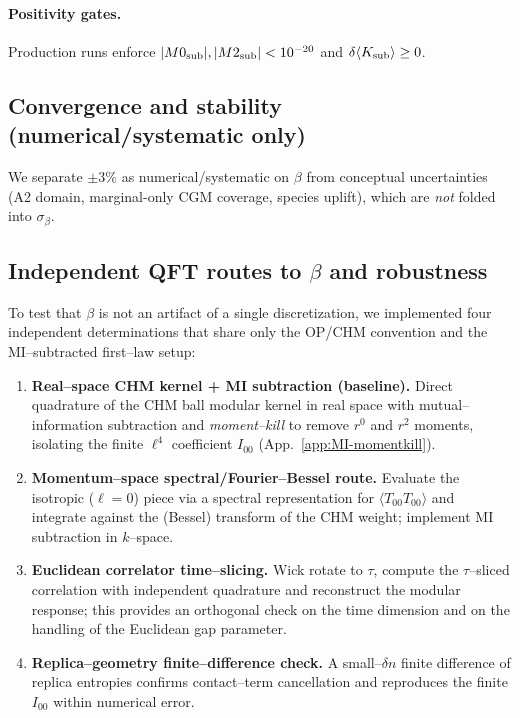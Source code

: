 \documentclass[aps,prd,onecolumn,superscriptaddress,nofootinbib]{revtex4-2}
\begin{document}
\paragraph*{Positivity gates.}
Production runs enforce $|M0_{\rm sub}|,|M2_{\rm sub}|<10^{-20}$ and $\delta\langle K_{\rm sub}\rangle \ge 0$.

\subsection{Convergence and stability (numerical/systematic only)}
\label{sec:convergence}
We separate $\pm3\%$ as numerical/systematic on $\beta$ from conceptual uncertainties (A2 domain, marginal-only CGM coverage, species uplift), which are \emph{not} folded into $\sigma_\beta$.

\subsection{Independent QFT routes to \texorpdfstring{$\beta$}{beta} and robustness}
\label{sec:beta-multimethod}
To test that $\beta$ is not an artifact of a single discretization, we implemented four independent determinations that share only the OP/CHM convention and the MI–subtracted first–law setup:

\begin{enumerate}[leftmargin=1.3em,label=(\alph*)]
\item \textbf{Real–space CHM kernel + MI subtraction (baseline).} Direct quadrature of the CHM ball modular kernel in real space with mutual–information subtraction and \emph{moment–kill} to remove $r^0$ and $r^2$ moments, isolating the finite $\ell^4$ coefficient $I_{00}$ (App.~\ref{app:MI-momentkill}).

\item \textbf{Momentum–space spectral/Fourier–Bessel route.} Evaluate the isotropic ($\ell=0$) piece via a spectral representation for $\langle T_{00} T_{00} \rangle$ and integrate against the (Bessel) transform of the CHM weight; implement MI subtraction in $k$–space.

\item \textbf{Euclidean correlator time–slicing.} Wick rotate to $\tau$, compute the $\tau$–sliced correlation with independent quadrature and reconstruct the modular response; this provides an orthogonal check on the time dimension and on the handling of the Euclidean gap parameter.

\item \textbf{Replica–geometry finite–difference check.} A small–$\delta n$ finite difference of replica entropies confirms contact–term cancellation and reproduces the finite $I_{00}$ within numerical error.
\end{enumerate}
\end{document}
